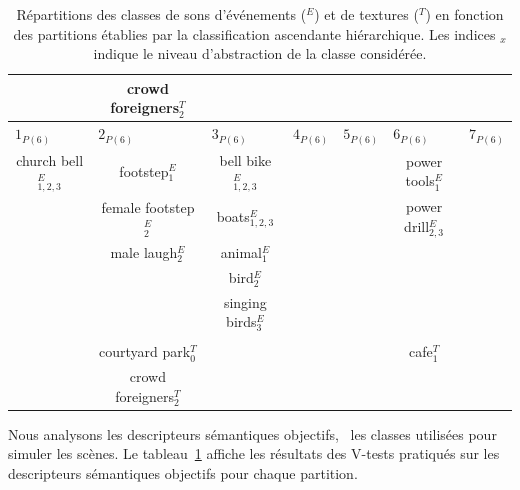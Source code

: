 \begin{table}[t]
\begin{tabular}{c|c|c|c|c|c|c}
                         &  crowd foreigners$_2^T$ &                       & \multicolumn{2}{c|}{} &                        &  \\               
\hline
\multicolumn{1}{l|}{$1_{P(6)}$} & \multicolumn{1}{l|}{$2_{P(6)}$} & \multicolumn{1}{l|}{$3_{P(6)}$}  & \multicolumn{1}{l|}{$4_{P(6)}$} & \multicolumn{1}{l|}{$5_{P(6)}$} & \multicolumn{1}{l|}{$6_{P(6)}$} & \multicolumn{1}{l}{$7_{P(6)}$} \\  
church bell$_{1,2,3}^E$  & footstep$_{1}^E$        & bell bike$_{1,2,3}^E$ &     &     & power tools$_1^E$      &   \\        
                         & female footstep$_{2}^E$ & boats$_{1,2,3}^E$     &     &     & power drill$_{2,3}^E$  &  \\  
                         & male laugh$_{2}^E$      & animal$_{1}^E$        &     &     &                        & \\  
                         &                         & bird$_2^E$            &     &     &                        & \\  
                         &                         & singing birds$_3^E$   &     &     &                        & \\  
                         &                         &                       &     &     &                        & \\                            
                         & courtyard park$_0^T$    &                       &     &     & cafe$_1^T$             & \\   
                         & crowd foreigners$_2^T$  &                       &     &     &                        & \\     
\hline

\end{tabular}
\vspace{0.5mm}
\caption[Répartitions des classes de sons en fonction des partitions établies par la classification ascendante hiérarchique]{Répartitions des classes de sons d'événements ($^E$) et de textures ($^T$) en fonction des partitions établies par la classification ascendante hiérarchique. Les indices $_{x}$ indique le niveau d'abstraction de la classe considérée.}
\label{tab:markerHacClass}
\end{table}

Nous analysons les descripteurs sémantiques objectifs, \ie~les classes utilisées pour simuler les scènes. Le tableau~\ref{tab:markerHacClass} affiche les résultats des V-tests pratiqués sur les descripteurs sémantiques objectifs pour chaque partition.

